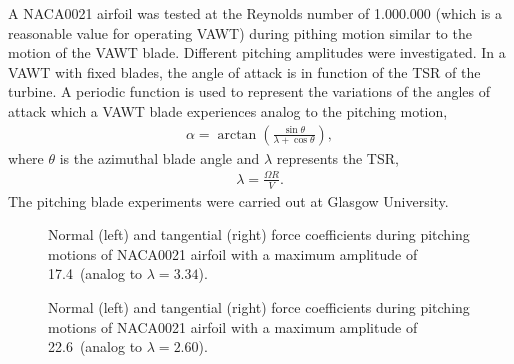 \documentclass[a4paper]{jpconf}
\begin{document}
A NACA0021 airfoil was tested at the Reynolds number of 1.000.000 (which is a
reasonable value for operating VAWT) during pithing motion similar to the motion
of the VAWT blade. Different pitching amplitudes were investigated. In a VAWT with
fixed blades, the angle of attack is in function of the TSR of the turbine. A
periodic function is used to represent the variations of the angles of attack
which a VAWT blade experiences analog to the pitching motion,
\begin{eqnarray}
    \alpha = \arctan \left( \frac{\sin \theta}{\lambda + \cos \theta} \right),
\end{eqnarray}
where $\theta$ is the azimuthal blade angle and $ \lambda $ represents the TSR,
\begin{eqnarray}
    \lambda =  \frac{\Omega R}{V}.
\end{eqnarray}
The pitching blade experiments were carried out at Glasgow
University\cite{angell1988collected}.\\

\begin{figure}[h]
\begin{minipage}{18pc}
\resizebox{\columnwidth}{!}{}
\end{minipage}\hspace{2pc}%
\begin{minipage}{18pc}
\resizebox{\columnwidth}{!}{}
\end{minipage}
\caption{\label{fig1}Normal (left) and tangential (right) force coefficients during pitching motions of NACA0021 airfoil with a maximum amplitude of 17.4\degree\ (analog to $\lambda = 3.34$).}
\end{figure}


\begin{figure}[h]
\begin{minipage}{18pc}
\resizebox{\columnwidth}{!}{}
\end{minipage}\hspace{2pc}%
\begin{minipage}{18pc}
\resizebox{\columnwidth}{!}{}
\end{minipage}
\caption{\label{fig2}Normal (left) and tangential (right) force coefficients during pitching motions of NACA0021 airfoil with a maximum amplitude of 22.6\degree\ (analog to $\lambda = 2.60$).}
\end{figure}
\end{document}
